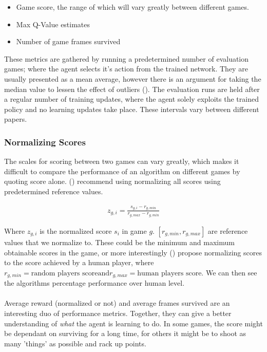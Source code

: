 \begin{itemize}
    \item Game score, the range of which will vary greatly between different games.
    \item Max Q-Value estimates
    \item Number of game frames survived
\end{itemize}

These metrics are gathered by running a predetermined number of evaluation games; where the agent selects it's action from the trained network. They are usually presented as a mean average, however there is an argument for taking the median value to lessen the effect of outliers (\citet{ale-eval-plat}). The evaluation runs are held after a regular number of training updates, where the agent solely exploits the trained policy and no learning updates take place. These intervals vary between different papers.

\subsubsection{Normalizing Scores}
The scales for scoring between two games can vary greatly, which makes it difficult to compare the performance of an algorithm on different games by quoting score alone. (\citet{ale-eval-plat}) recommend using normalizing all scores using predetermined reference values.

\begin{align}
    z_{g, i} = \frac{s_{g, i} - r_{g, min}}{r_{g, max} - r_{g, min}}
\end{align}

Where $z_{g, i}$ is the normalized score $s_i$ in game $g$. $[r_{g, min}, r_{g, max}]$ are reference values that we normalize to. These could be the minimum and maximum obtainable scores in the game, or more interestingly (\citet{human}) propose normalizing scores to the score achieved by a human player, where $r_{g, min} = \text{random players score} \text{and} r_{g, max} = \text{human players score}$. We can then see the algorithms percentage performance over human level. \paragraph{}

Average reward (normalized or not) and average frames survived are an interesting duo of performance metrics. Together, they can give a better understanding of \textit{what} the agent is learning to do. In some games, the score might be dependant on surviving for a long time, for others it might be to shoot as many 'things' as possible and rack up points.
